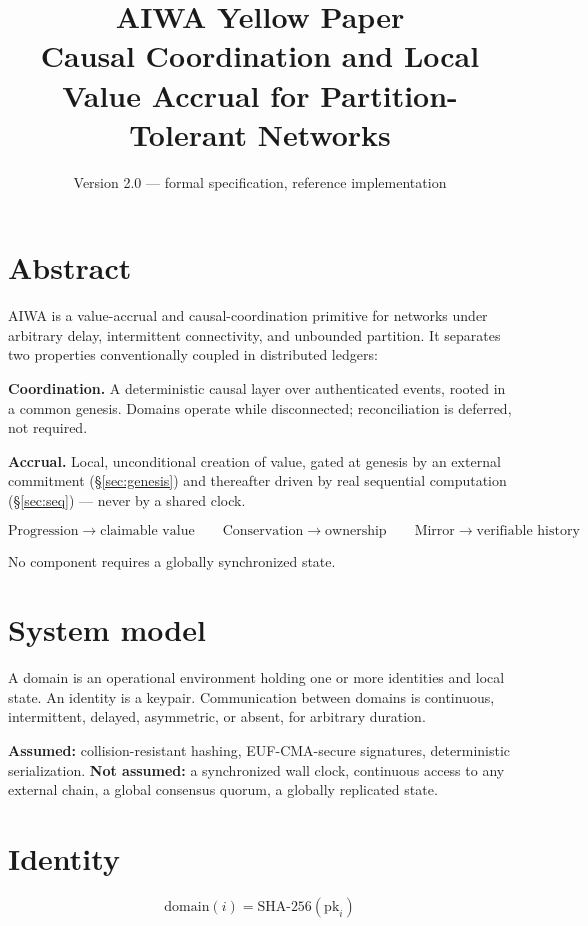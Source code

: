 \documentclass[10pt]{article}
\title{\textbf{AIWA Yellow Paper}\\[2pt]\normalsize Causal Coordination and Local Value Accrual for Partition-Tolerant Networks}
\author{}
\date{Version 2.0 --- formal specification, reference implementation}
\begin{document}
\maketitle
\vspace{-1.5em}

\section*{Abstract}

AIWA is a value-accrual and causal-coordination primitive for networks under arbitrary delay, intermittent connectivity, and unbounded partition. It separates two properties conventionally coupled in distributed ledgers:

\textbf{Coordination.} A deterministic causal layer over authenticated events, rooted in a common genesis. Domains operate while disconnected; reconciliation is deferred, not required.

\textbf{Accrual.} Local, unconditional creation of value, gated at genesis by an external commitment (\S\ref{sec:genesis}) and thereafter driven by real sequential computation (\S\ref{sec:seq}) --- never by a shared clock.

\[
\text{Progression} \to \text{claimable value} \qquad \text{Conservation} \to \text{ownership} \qquad \text{Mirror} \to \text{verifiable history}
\]

No component requires a globally synchronized state.

\section{System model}

A domain is an operational environment holding one or more identities and local state. An identity is a keypair. Communication between domains is continuous, intermittent, delayed, asymmetric, or absent, for arbitrary duration.

\textbf{Assumed:} collision-resistant hashing, EUF-CMA-secure signatures, deterministic serialization. \textbf{Not assumed:} a synchronized wall clock, continuous access to any external chain, a global consensus quorum, a globally replicated state.

\section{Identity}

\[
\mathrm{domain}(i) = \mathrm{SHA\text{-}256}(\mathrm{pk}_i)
\]
\end{document}
